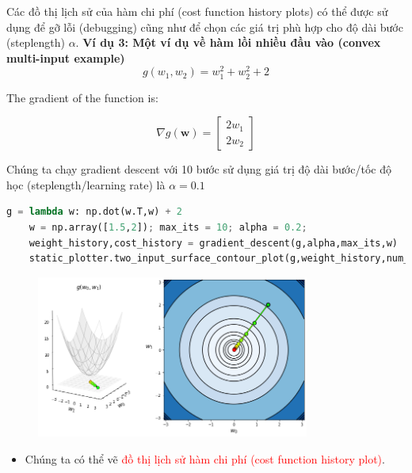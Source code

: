 \documentclass{book}
\begin{document}
Các đồ thị lịch sử của hàm chi phí (cost function history plots) có thể được sử dụng để gỡ lỗi (debugging) cũng như để chọn các giá trị phù hợp cho độ dài bước (steplength) $\alpha$.
\textbf{Ví dụ 3: Một ví dụ về hàm lồi nhiều đầu vào (convex multi-input example)}
\begin{equation*}
    g(w_1,w_2) = w_1^2 + w_2^2 + 2
\end{equation*}

The gradient of the function is:
    
\begin{equation*}
    \nabla g \left(\mathbf{w}\right) = 
        \begin{bmatrix}
        2w_1 \\
        2w_2
        \end{bmatrix}
\end{equation*}

Chúng ta chạy gradient descent với 10 bước sử dụng giá trị độ dài bước/tốc độ học (steplength/learning rate) là $\alpha=0.1$
\begin{lstlisting}[language=python]
    g = lambda w: np.dot(w.T,w) + 2
    w = np.array([1.5,2]); max_its = 10; alpha = 0.2;
    weight_history,cost_history = gradient_descent(g,alpha,max_its,w)
    static_plotter.two_input_surface_contour_plot(g,weight_history,num_contours = 25,view = [10,30])
\end{lstlisting}
\begin{figure}[H]
    \centering
    \includegraphics[width=0.8\textwidth]{images/a_convex_multi-input_example.png}
\end{figure}
\begin{itemize}
    \item Chúng ta có thể vẽ \textcolor{red}{đồ thị lịch sử hàm chi phí (cost function history plot)}.
\end{itemize}
\end{document}
